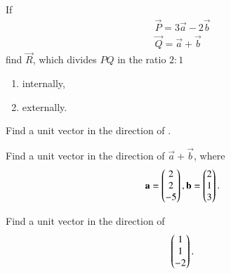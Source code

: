 %
\item If 
\begin{align}
\vec{P} = 3\vec{a}-2\vec{b}
\\
\vec{Q} = \vec{a}+\vec{b}
\end{align}
%
find $\vec{R}$, which divides $PQ$ in the ratio $2:1$
\begin{enumerate}
\item internally,
\item externally.
\end{enumerate}
%
\item Find a unit vector in the direction of .
%
\item Find a unit vector in the direction of $\vec{a}+\vec{b}$, where 
%
\begin{align}
\mathbf{a} = \begin{pmatrix}2\\2\\-5\end{pmatrix}, \mathbf{b} = \begin{pmatrix}2\\1\\3\end{pmatrix}.
\end{align}
%
\item Find a unit vector in the direction of 
%
\begin{align}
\begin{pmatrix}1\\1\\-2\end{pmatrix}.
\end{align}
%

%

